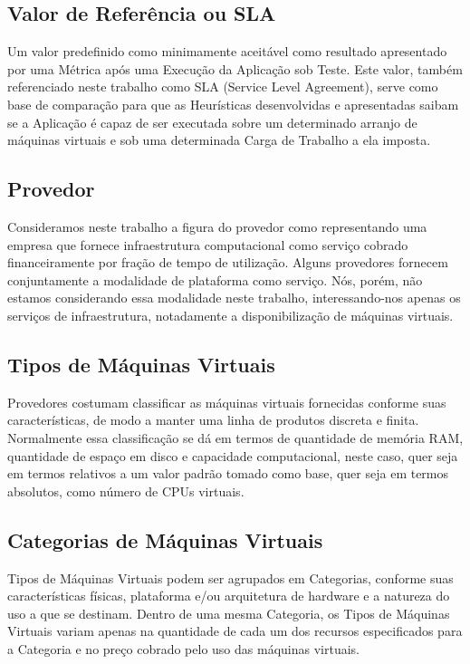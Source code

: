 \subsection{Valor de Referência ou SLA}
Um valor predefinido como minimamente aceitável como resultado apresentado por 
uma Métrica após uma Execução da Aplicação sob Teste. Este valor, também 
referenciado neste trabalho como SLA (Service Level Agreement), serve como base 
de comparação para que as Heurísticas desenvolvidas e apresentadas saibam se a 
Aplicação é capaz de ser executada sobre um determinado arranjo de máquinas 
virtuais e sob uma determinada Carga de Trabalho a ela imposta.

\subsection{Provedor}
Consideramos neste trabalho a figura do provedor como representando uma empresa 
que fornece infraestrutura computacional como serviço cobrado financeiramente 
por fração de tempo de utilização. Alguns provedores fornecem conjuntamente a 
modalidade de plataforma como serviço. Nós, porém, não estamos considerando essa 
modalidade neste trabalho, interessando-nos apenas os serviços de infraestrutura, 
notadamente a disponibilização de máquinas virtuais.

\subsection{Tipos de Máquinas Virtuais}
Provedores costumam classificar as máquinas virtuais fornecidas conforme suas 
características, de modo a manter uma linha de produtos discreta e finita. 
Normalmente essa classificação se dá em termos de quantidade de memória RAM, 
quantidade de espaço em disco e capacidade computacional, neste caso, quer seja 
em termos relativos a um valor padrão tomado como base, quer seja em termos 
absolutos, como número de CPUs virtuais.

\subsection{Categorias de Máquinas Virtuais}
Tipos de Máquinas Virtuais podem ser agrupados em Categorias, conforme suas 
características físicas, plataforma e/ou arquitetura de hardware e a natureza do 
uso a que se destinam. Dentro de uma mesma Categoria, os Tipos de Máquinas 
Virtuais variam apenas na quantidade de cada um dos recursos especificados para 
a Categoria e no preço cobrado pelo uso das máquinas virtuais.

